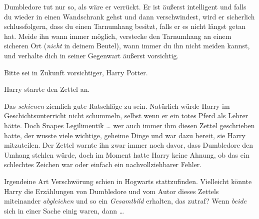 \begin{writtenNote}
Dumbledore tut nur so, als wäre er verrückt. Er ist äußerst intelligent und falls du wieder in einen Wandschrank gehst und dann verschwindest, wird er sicherlich schlussfolgern, dass du einen Tarnumhang besitzt, falls er es nicht längst getan hat. Meide ihn wann immer möglich, verstecke den Tarnumhang an einem sicheren Ort (\emph{nicht} in deinem Beutel), wann immer du ihn nicht meiden kannst, und verhalte dich in seiner Gegenwart äußerst vorsichtig.

Bitte sei in Zukunft vorsichtiger, Harry Potter.

\end{writtenNote}

Harry starrte den Zettel an.

Das \emph{schienen} ziemlich gute Ratschläge zu sein. Natürlich würde Harry im Geschichtsunterricht nicht schummeln, selbst wenn er ein totes Pferd als Lehrer hätte. Doch Snapes Legilimentik … wer auch immer ihm diesen Zettel geschrieben hatte, der wusste viele wichtige, geheime Dinge und war dazu bereit, sie Harry mitzuteilen. Der Zettel warnte ihn zwar immer noch davor, dass Dumbledore den Umhang stehlen würde, doch im Moment hatte Harry keine Ahnung, ob das ein schlechtes Zeichen war oder einfach ein nachvollziehbarer Fehler.

Irgendeine Art Verschwörung schien in Hogwarts stattzufinden. Vielleicht könnte Harry die Erzählungen von Dumbledore und vom Autor dieses Zettels miteinander \emph{abgleichen} und so ein \emph{Gesamtbild} erhalten, das zutraf? Wenn \emph{beide} sich in einer Sache einig waren, dann …

